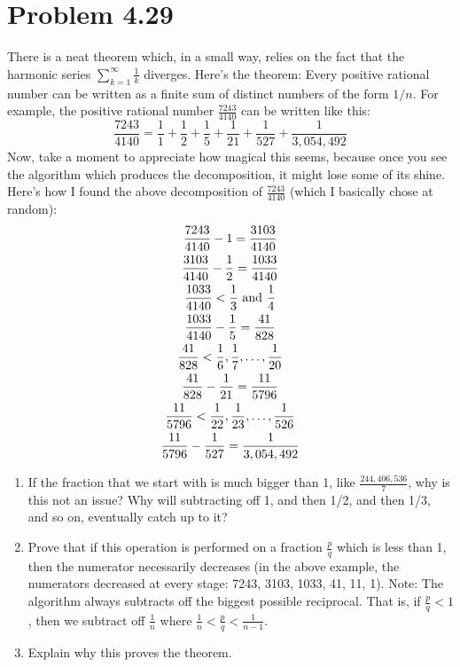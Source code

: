 \documentclass[12pt]{report}
\begin{document}
\section{Problem 4.29}
    There is a neat theorem which, in a small way, relies on the fact that the harmonic series $\sum_{k = 1}^{\infty} \frac{1}{k}$ diverges. 
    Here's the theorem: Every positive rational number can be written as a finite sum of distinct numbers of the form $1/n$. 
    For example, the positive rational number $\frac{7243}{4140}$ can be written like this: 
    \begin{equation*}
        \frac{7243}{4140} = \frac{1}{1} + \frac{1}{2} + \frac{1}{5} + \frac{1}{21} + \frac{1}{527} + \frac{1}{3,054,492}
    \end{equation*}
    Now, take a moment to appreciate how magical this seems, because once you see the algorithm which produces the decomposition, it might lose some of its shine. 
    Here's how I found the above decomposition of $\frac{7243}{4140}$ (which I basically chose at random): 
    \begin{gather*}
        \frac{7243}{4140} - 1 = \frac{3103}{4140}\\
        \frac{3103}{4140} - \frac{1}{2} = \frac{1033}{4140}\\
        \frac{1033}{4140} < \frac{1}{3} \text{ and } \frac{1}{4}\\
        \frac{1033}{4140} - \frac{1}{5} = \frac{41}{828}\\
        \frac{41}{828} < \frac{1}{6}, \frac{1}{7}, \dots , \frac{1}{20}\\
        \frac{41}{828} - \frac{1}{21} = \frac{11}{5796}\\
        \frac{11}{5796} < \frac{1}{22}, \frac{1}{23}, \dots , \frac{1}{526}\\
        \frac{11}{5796} - \frac{1}{527} = \frac{1}{3,054,492}
    \end{gather*}
    \begin{enumerate}[label=(\alph*)]
        \item   If the fraction that we start with is much bigger than 1, like $\frac{244,406,536}{7}$, why is this not an issue? Why will subtracting off 1, and then 1/2, and then 1/3, and so on, eventually catch up to it? 
        \item   Prove that if this operation is performed on a fraction $\frac{p}{q}$ which is less than 1, then the numerator necessarily decreases (in the  above example, the numerators decreased at every stage: 7243,  3103, 1033, 41, 11, 1). Note: The algorithm always subtracts  off the biggest possible reciprocal. That is, if $\frac{p}{q} < 1$, then we subtract off $\frac{1}{n}$ where $\frac{1}{n} < \frac{p}{q} < \frac{1}{n - 1}$. 
        \item   Explain why this proves the theorem.
    \end{enumerate}
\end{document}
